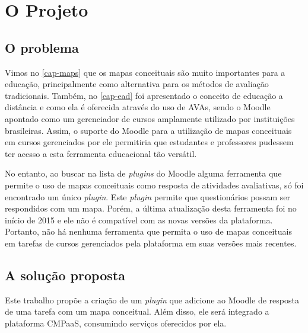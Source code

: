 \documentclass[
	12pt,				%
	openright,			%
	oneside,			%
	a4paper,			%
	english,			%
	french,				%
	spanish,			%
	brazil				%
	]{abntex2}
\begin{document}
 

\chapter{O Projeto}\label{cap-projeto}

\section{O problema}

Vimos no \autoref{cap-maps} que os mapas conceituais são muito importantes para a educação, principalmente como alternativa para os métodos de avaliação tradicionais. Também, no \autoref{cap-ead} foi apresentado o conceito de educação a distância e como ela é oferecida através do uso de AVAs, sendo o Moodle apontado como um gerenciador de cursos amplamente utilizado por instituições brasileiras. Assim, o suporte do Moodle para a utilização de mapas conceituais em cursos gerenciados por ele permitiria que estudantes e professores pudessem ter acesso a esta ferramenta educacional tão versátil.    

No entanto, ao buscar na lista de \textit{plugins} do Moodle alguma ferramenta que permite o uso de mapas conceituais como resposta de atividades avaliativas, só foi encontrado um único \textit{plugin}. Este \textit{plugin} permite que questionários possam ser respondidos com um mapa. Porém, a última atualização desta ferramenta foi no início de 2015 e ele não é compatível com as novas versões da plataforma. Portanto, não há nenhuma ferramenta que permita o uso de mapas conceituais em tarefas de cursos gerenciados pela plataforma em suas versões mais recentes.



\section{A solução proposta}

Este trabalho propõe a criação de um \textit{plugin} que adicione ao Moodle de resposta de uma tarefa com um mapa conceitual. Além disso, ele será integrado a plataforma CMPaaS, consumindo serviços oferecidos por ela.
\end{document}
